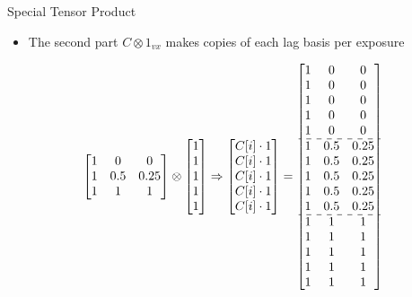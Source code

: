 \documentclass[english]{beamer}
\begin{document}
\begin{frame}{Special Tensor Product}
\begin{itemize}
    \item The second part \(C \otimes 1_{vx}\) makes copies of each lag basis per exposure
\end{itemize}
\footnotesize
\[ 
\begin{bmatrix}
1 & 0 & 0 \\
1 & 0.5 & 0.25 \\
1 & 1 & 1
\end{bmatrix} \otimes \begin{bmatrix}
    1 \\
    1 \\
    1 \\
    1 \\
    1
\end{bmatrix}
\Rightarrow
\begin{bmatrix} 
C[i] \cdot 1 \\ 
C[i] \cdot 1 \\ 
C[i] \cdot 1 \\
C[i] \cdot 1 \\
C[i] \cdot 1
\end{bmatrix}
=\begin{bmatrix}
1 & 0 & 0 \\
1 & 0 & 0 \\
1 & 0 & 0 \\
1 & 0 & 0 \\
1 & 0 & 0 \\ \hdashline
1 & 0.5 & 0.25 \\
1 & 0.5 & 0.25 \\
1 & 0.5 & 0.25 \\
1 & 0.5 & 0.25 \\
1 & 0.5 & 0.25 \\ \hdashline
1 & 1 & 1 \\
1 & 1 & 1 \\
1 & 1 & 1 \\
1 & 1 & 1 \\
1 & 1 & 1 \\ 
\end{bmatrix}
\]
\end{frame}
\end{document}
